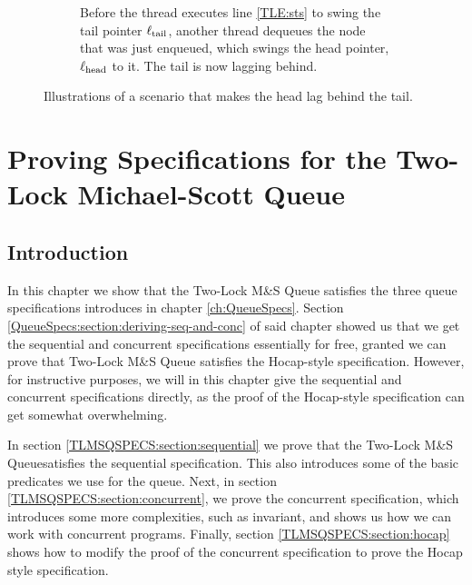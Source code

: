 \documentclass[a4paper, 10pt]{report}
\theoremstyle{definition}
\newcommand{\msq}{M\&S Queue}
\newcommand{\tlmsq}{Two-Lock \msq{}}
\newcommand{\locN}[1]{\loc_{\mathrm{#1}}}
\newcommand{\lochead}{\locN{head}}
\newcommand{\loctail}{\locN{tail}}
\newcommand{\node}{x}
\begin{document}
\begin{figure}
\begin{subfigure}{\textwidth}
\begin{adjustbox}{center}
    \end{adjustbox}
    \caption{Before the thread executes line \ref{TLE:sts} to swing the tail pointer $\loctail$, another thread dequeues the node that was just enqueued, which swings the head pointer, $\lochead$ to it. The tail is now lagging behind.}
    \label{TLMSQ:impl:figure:lag:c}
  \end{subfigure}
  \caption{Illustrations of a scenario that makes the head lag behind the tail.}
  \label{TLMSQ:impl:figure:lag}
\end{figure}


\chapter{Proving Specifications for the Two-Lock Michael-Scott Queue}
\label{ch:TLMSQSPECS}

\section{Introduction}
\label{TLMSQSPECS:section:introduction}

In this chapter we show that the \tlmsq{} satisfies the three queue specifications introduces in chapter \ref{ch:QueueSpecs}. Section \ref{QueueSpecs:section:deriving-seq-and-conc} of said chapter showed us that we get the sequential and concurrent specifications essentially for free, granted we can prove that \tlmsq{} satisfies the Hocap-style specification. However, for instructive purposes, we will in this chapter give the sequential and concurrent specifications directly, as the proof of the Hocap-style specification can get somewhat overwhelming.

In section \ref{TLMSQSPECS:section:sequential} we prove that the \tlmsq satisfies the sequential specification. This also introduces some of the basic predicates we use for the queue. Next, in section \ref{TLMSQSPECS:section:concurrent}, we prove the concurrent specification, which introduces some more complexities, such as invariant, and shows us how we can work with concurrent programs. Finally, section \ref{TLMSQSPECS:section:hocap} shows how to modify the proof of the concurrent specification to prove the Hocap style specification.
\end{document}
